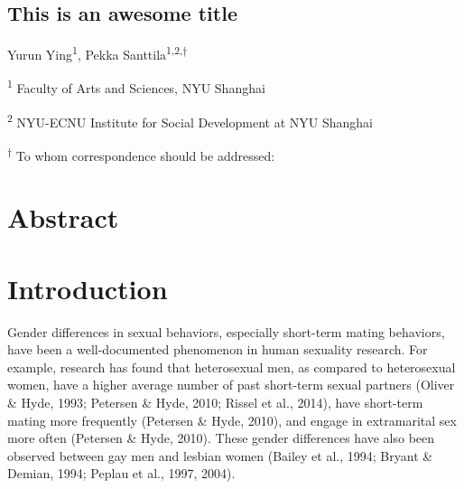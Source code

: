 \documentclass[
  11pt,
]{article}
\author{}
\date{\vspace{-2.5em}}
\begin{document}
\begin{titlepage}

\begin{center}

\vspace*{30mm}

\hypertarget{this-is-an-awesome-title}{%
\section*{\texorpdfstring{\textbf{This is an awesome
title}}{This is an awesome title}}\label{this-is-an-awesome-title}}

\vspace{30mm}

Yurun Ying\textsuperscript{1}, Pekka
Santtila\textsuperscript{1,2,\(\dagger\)}

\textsuperscript{1} Faculty of Arts and Sciences, NYU Shanghai

\textsuperscript{2} NYU-ECNU Institute for Social Development at NYU
Shanghai

\end{center}

\vspace{40mm}

\textsuperscript{\(\dagger\)} To whom correspondence should be
addressed:

\end{titlepage}

\newpage

\hypertarget{abstract}{%
\section*{Abstract}\label{abstract}}

\newpage

\hypertarget{introduction}{%
\section{Introduction}\label{introduction}}

Gender differences in sexual behaviors, especially short-term mating
behaviors, have been a well-documented phenomenon in human sexuality
research. For example, research has found that heterosexual men, as
compared to heterosexual women, have a higher average number of past
short-term sexual partners (Oliver \& Hyde, 1993; Petersen \& Hyde,
2010; Rissel et al., 2014), have short-term mating more frequently
(Petersen \& Hyde, 2010), and engage in extramarital sex more often
(Petersen \& Hyde, 2010). These gender differences have also been
observed between gay men and lesbian women (Bailey et al., 1994; Bryant
\& Demian, 1994; Peplau et al., 1997, 2004).
\end{document}
